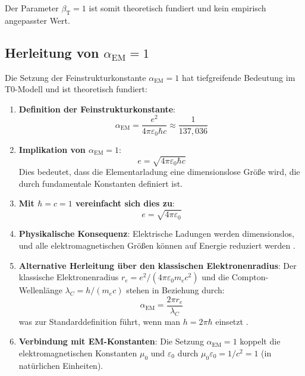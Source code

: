 \documentclass[12pt,a4paper]{article}
\newcommand{\alphaEM}{\alpha_{\text{EM}}}
\newcommand{\betaT}{\beta_{\text{T}}}
\begin{document}
	Der Parameter $\betaT = 1$ ist somit theoretisch fundiert und kein empirisch angepasster Wert.
	
	\subsection{Herleitung von $\alphaEM = 1$}
	
	Die Setzung der Feinstrukturkonstante $\alphaEM = 1$ hat tiefgreifende Bedeutung im T0-Modell und ist theoretisch fundiert:
	
	\begin{enumerate}
		\item \textbf{Definition der Feinstrukturkonstante}:
		\begin{equation}
			\alphaEM = \frac{e^2}{4\pi\varepsilon_0\hbar c} \approx \frac{1}{137,036}
		\end{equation}
		
		\item \textbf{Implikation von $\alphaEM = 1$}:
		\begin{equation}
			e = \sqrt{4\pi\varepsilon_0\hbar c}
		\end{equation}
		Dies bedeutet, dass die Elementarladung eine dimensionslose Größe wird, die durch fundamentale Konstanten definiert ist.
		
		\item \textbf{Mit $\hbar = c = 1$ vereinfacht sich dies zu}:
		\begin{equation}
			e = \sqrt{4\pi\varepsilon_0}
		\end{equation}
		
		\item \textbf{Physikalische Konsequenz}: 
		Elektrische Ladungen werden dimensionslos, und alle elektromagnetischen Größen können auf Energie reduziert werden \cite{pascher_alpha_2025}.
		
		\item \textbf{Alternative Herleitung über den klassischen Elektronenradius}:
		Der klassische Elektronenradius $r_e = e^2/(4\pi\varepsilon_0m_e c^2)$ und die Compton-Wellenlänge $\lambda_C = h/(m_e c)$ stehen in Beziehung durch:
		\begin{equation}
			\alphaEM = \frac{2\pi r_e}{\lambda_C}
		\end{equation}
		was zur Standarddefinition führt, wenn man $h = 2\pi\hbar$ einsetzt \cite{pascher_alpha_2025}.
		
		\item \textbf{Verbindung mit EM-Konstanten}:
		Die Setzung $\alphaEM = 1$ koppelt die elektromagnetischen Konstanten $\mu_0$ und $\varepsilon_0$ durch $\mu_0\varepsilon_0 = 1/c^2 = 1$ (in natürlichen Einheiten).
	\end{enumerate}
	
\end{document}
